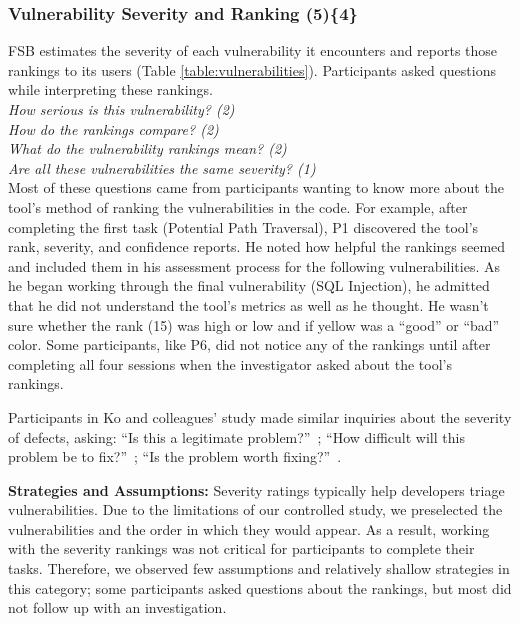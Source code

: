 \documentclass[10pt,journal,compsoc]{IEEEtran}
\begin{document}

\subsubsection{Vulnerability Severity and Ranking (5)\{4\}}

\label{bsr}

FSB estimates the severity of each vulnerability it encounters and reports those rankings to its users (Table \ref{table:vulnerabilities}). 
Participants asked questions while interpreting these rankings.
\\

\noindent\emph{How serious is this vulnerability? (2)} \\
\emph{How do the rankings compare? (2)} \\
\emph{What do the vulnerability rankings mean? (2)} \\
\emph{Are all these vulnerabilities the same severity? (1)}
\\
 
Most of these questions came from participants wanting to know more about the tool's method of ranking the vulnerabilities in the code.
For example, after completing the first task (Potential Path Traversal), P1 discovered the tool's rank, severity, and confidence reports. 
He noted how helpful the rankings seemed and included them in his assessment process for the following vulnerabilities.
As he began working through the final vulnerability (SQL Injection), he admitted that he did not understand the tool's metrics as well as he thought. 
He wasn't sure whether the rank (15) was high or low and if yellow was a ``good'' or ``bad'' color.
Some participants, like P6, did not notice any of the rankings until after completing all four sessions when the investigator asked about the tool's rankings.

Participants in Ko and colleagues' study made similar inquiries about the severity of defects, asking:
``Is this a legitimate problem?''~\cite{Ko:2007:information};
``How difficult will this problem be to fix?''~\cite{Ko:2007:information};
``Is the problem worth fixing?''~\cite{Ko:2007:information}.


\textbf{Strategies and Assumptions:}
Severity ratings typically help developers triage vulnerabilities.
Due to the limitations of our controlled study, we preselected the vulnerabilities and the order in which they would appear.
As a result, working with the severity rankings was not critical for participants to complete their tasks.
Therefore, we observed few assumptions and relatively shallow strategies in this category; some participants asked questions about the rankings, but most did not follow up with an investigation.
\end{document}
